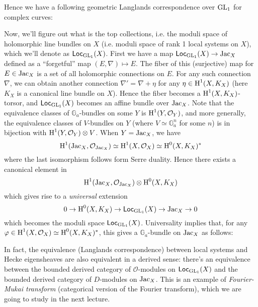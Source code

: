 Hence we have a following geometric Langlands correspondence over $\operatorname{\mathrm{GL}}_1$ for complex curves:
\begin{center}
\end{center}
Now, we'll figure out what is the top collections, i.e. the moduli space of holomorphic line bundles on $X$
(i.e. moduli space of rank 1 local systems on $X$), which we'll denote as $\operatorname{\mathsf{Loc}}_{\operatorname{\mathrm{GL}}_1}(X)$.
First we have a map $\operatorname{\mathsf{Loc}}_{\operatorname{\mathrm{GL}}_1}(X) \to \operatorname{\mathrm{Jac}}_X$ defined as a ``forgetful'' map $(E, \nabla) \mapsto E$.
The fiber of this (surjective) map for $E \in \operatorname{\mathrm{Jac}}_X$ is a set of all holomorphic connections on $E$.
For any such connection $\nabla$, we can obtain another connection $\nabla' = \nabla + \eta$ for any $\eta \in \operatorname{\mathrm{H}}^1(X, K_X)$ 
(here $K_X$ is a canonical line bundle on $X$).
Hence the fiber becomes a $\operatorname{\mathrm{H}}^{1}(X, K_X)$-torsor, and $\operatorname{\mathsf{Loc}}_{\operatorname{\mathrm{GL}}_1}(X)$ becomes an affine bundle over $\operatorname{\mathrm{Jac}}_X$.
Note that the equivalence classes of $\mathbb{G}_a$-bundles on some $Y$ is $\operatorname{\mathrm{H}}^{1}(Y, \mathcal{O}_Y)$, 
and more generally, the equivalence classes of $V$-bundles on $Y$ (where $V \simeq \mathbb{G}_{a}^{n}$ for some $n$) is in bijection with
$\operatorname{\mathrm{H}}^{1}(Y, \mathcal{O}_Y) \otimes V$.
When $Y = \operatorname{\mathrm{Jac}}_X$, we have
$$
\operatorname{\mathrm{H}}^{1}(\operatorname{\mathrm{Jac}}_X, \mathcal{O}_{\operatorname{\mathrm{Jac}}_X}) \simeq \operatorname{\mathrm{H}}^{1}(X, \mathcal{O}_X) \simeq \operatorname{\mathrm{H}}^{0}(X, K_X)^{*}
$$
where the last isomorphism follows form Serre duality. Hence there exists a canonical element in 
$$
\operatorname{\mathrm{H}}^{1}(\operatorname{\mathrm{Jac}}_X, \mathcal{O}_{\operatorname{\mathrm{Jac}}_X}) \otimes \operatorname{\mathrm{H}}^{0}(X, K_X)
$$
which gives rise to a \emph{universal} extension
$$
0 \to \operatorname{\mathrm{H}}^{0}(X, K_X) \to \operatorname{\mathsf{Loc}}_{\operatorname{\mathrm{GL}}_1}(X) \to \operatorname{\mathrm{Jac}}_X \to 0
$$
which becomes the moduli space $\operatorname{\mathsf{Loc}}_{\operatorname{\mathrm{GL}}_1}(X)$.
Universality implies that, for any $\varphi \in \operatorname{\mathrm{H}}^{1}(X, \mathcal{O}_X) \simeq \operatorname{\mathrm{H}}^{0}(X, K_X)^{*}$, 
this gives a $\mathbb{G}_a$-bundle on $\operatorname{\mathrm{Jac}}_X$ as follows:
\begin{center}
\end{center}

In fact, the equivalence (Langlands correspondence) between local systems and Hecke eigensheaves are also equivalent
in a derived sense: there's an equivalence between the bounded derived category of $\mathcal{O}$-modules on $\operatorname{\mathsf{Loc}}_{\operatorname{\mathrm{GL}}_1}(X)$
and the bounded derived category of $D$-modules on $\operatorname{\mathrm{Jac}}_X$.
This is an example of \emph{Fourier-Mukai transform} (categorical version of the Fourier transform), which we are going to study in the next lecture.